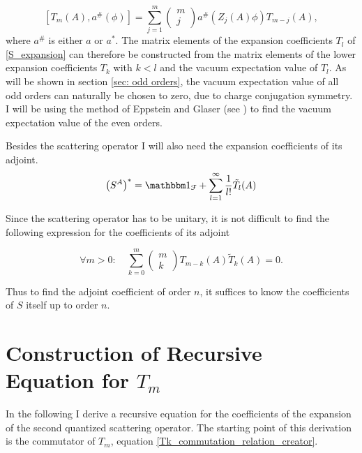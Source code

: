 \documentclass[b5paper,draft,openbib,12pt]{memoir}
\newcommand{\id}{{\mathbbm 1}}
\begin{document}
\begin{equation}
\left[T_m(A) , a^\# (\phi)\right]= \sum_{j=1}^{m} \begin{pmatrix} m \\ j \end{pmatrix} a^\# \left(Z_j (A) \phi \right) T_{m-j}(A), \label{Tk_commutation_relation}
\end{equation}
where \(a^\#\) is either \(a\) or \(a^*\).
The matrix elements of the expansion coefficients \(T_l\) of \eqref{S_expansion} can therefore be constructed from the matrix elements of the lower expansion coefficients \(T_k\) with \(k<l\) and the vacuum expectation value of \(T_l\). As will be shown in section \ref{sec: odd orders}, the vacuum expectation value of all odd orders can naturally be chosen to zero, due to charge conjugation symmetry. I will be using the method of Eppstein and Glaser (see \cite{epstein1973role, scharf2014finite})  to find the vacuum expectation value of the even orders.

Besides the scattering operator I will also need the expansion coefficients of its adjoint. 
\begin{equation}\label{S_adjoint}
\left(S^A\right)^*=\id_\mathcal{F}+\sum_{l=1}^\infty \frac{1}{l!} \tilde{T}_l(A)
\end{equation}

Since the scattering operator has to be unitary, it is not difficult to find the following expression for the coefficients of its adjoint

\begin{equation}
\forall m>0:\quad \sum_{k=0}^m \begin{pmatrix}
m\\k
\end{pmatrix} T_{m-k} (A) \tilde{T}_{k}(A)=0.
\end{equation}

Thus to find the adjoint coefficient of order \(n\), it suffices to know the coefficients of \(S\) itself up to order \(n\). 

\section{Construction of Recursive Equation for \(T_m\)}

In the following I derive a recursive equation for the coefficients of the expansion 
of the second quantized scattering operator. The starting point of this derivation is 
the commutator of \(T_m\), equation \eqref{Tk_commutation_relation_creator}.
\end{document}
